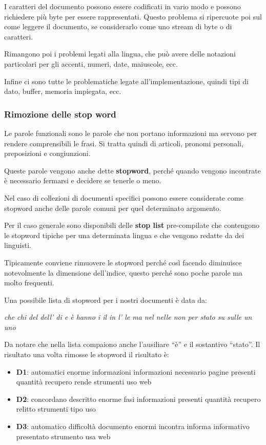 I caratteri del documento possono essere codificati in vario modo e possono richiedere più byte per essere rappresentati. 
Questo problema si ripercuote poi sul come leggere il documento, se considerarlo come uno stream di byte o di caratteri.

Rimangono poi i problemi legati alla lingua, che può avere delle notazioni particolari per gli accenti, numeri, date, maiuscole, ecc.

Infine ci sono tutte le problematiche legate all'implementazione, quindi tipi di dato, buffer, memoria impiegata, ecc.

\subsubsection{Rimozione delle stop word} 

Le parole funzionali sono le parole che non portano informazioni ma servono per rendere comprensibili le frasi. Si tratta quindi di articoli, pronomi personali, preposizioni e congiunzioni.

Queste parole vengono anche dette \textbf{stopword}, perché quando vengono incontrate è necessario fermarsi e decidere se tenerle o meno.

Nel caso di collezioni di documenti specifici possono essere considerate come stopword anche delle parole comuni per quel determinato argomento.

Per il caso generale sono disponibili delle \textbf{stop list} pre-compilate che contengono le stopword tipiche per una determinata lingua e che vengono redatte da dei linguisti.

Tipicamente conviene rimuovere le stopword perché così facendo diminuisce notevolmente la dimensione dell'indice, questo perché sono poche parole ma molto frequenti.

Una possibile lista di stopword per i nostri documenti è data da:

\begin{center}
	\textit{che chi del dell’ di e è hanno i il in l’ le ma nel
		nelle non per stato su sulle un uno }
\end{center}

Da notare che nella lista compaiono anche l'ausiliare ``è'' e il sostantivo ``stato''.
Il risultato una volta rimosse le stopword il risultato è:

\begin{itemize}
	\item \textbf{D1}: automatici enorme informazioni informazioni necessario pagine presenti quantità recupero rende strumenti uso web 
	\item \textbf{D2}: concordano descritto enorme fasi informazioni presenti quantità recupero relitto strumenti tipo uso
	\item \textbf{D3}: automatico difficoltà documento enormi incontra informa informativo presentato strumento usa web
\end{itemize}

